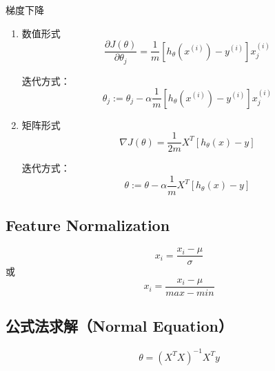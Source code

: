 梯度下降
\begin{enumerate}
\item 数值形式
\begin{equation}
	\frac{\partial J(\theta)}{\partial \theta_j} =
	    \frac{1}{m} \left[ h_\theta(x^{(i)}) - y^{(i)} \right] x_j^{(i)}
\end{equation}

迭代方式：
\begin{equation}
	\theta_j := \theta_j - \alpha \frac{1}{m} \left[h_\theta(x^{(i)}) - y^{(i)}\right] x_j^{(i)}
\end{equation}

\item 矩阵形式
\begin{equation}
	\nabla J(\theta) = \frac{1}{2m} X^T \left[h_\theta(x) - y\right]
\end{equation}

迭代方式：
\begin{equation}
	\theta := \theta - \alpha \frac{1}{m} X^T \left[ h_\theta(x) - y\right]
\end{equation}
\end{enumerate}



\subsection{Feature Normalization}
\begin{equation}
	x_i = \frac{x_i - \mu}{\sigma}
\end{equation}
或
\begin{equation}
	x_i = \frac{x_i - \mu}{max - min}
\end{equation}



\subsection{公式法求解（Normal Equation）}
\begin{equation}
	\theta = (X^T X)^{-1} X^T y
\end{equation}















